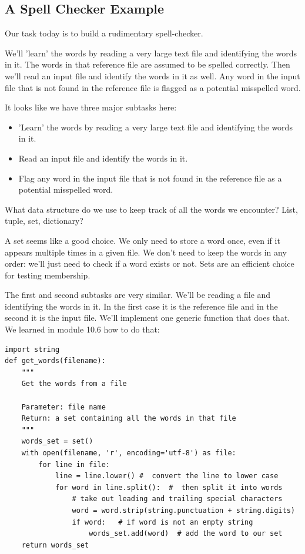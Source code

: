\documentclass{article}
\begin{document}
\subsection{A Spell Checker Example}

Our task today is to build a rudimentary spell-checker.

We’ll 'learn' the words by reading a very large text file and identifying the words in it.  The words in that reference file are assumed to be spelled correctly. Then we'll read an input file and identify the words in it as well.  Any word in the input file that is not found in the reference file is flagged as a potential misspelled word.

It looks like we have three major subtasks here:

\begin{itemize}
\item 'Learn' the words by reading a very large text file and identifying the words in it.  
\item Read an input file and identify the words in it.
\item Flag any word in the input file that is not found in the reference file as a potential misspelled word.
\end{itemize}

What data structure do we use to keep track of all the words we encounter?  List, tuple, set, dictionary?

A set seems like a good choice.  We only need to store a word once, even if it appears multiple times in a given file. We don’t need to keep the words in any order:  we’ll just need to check if a word exists or not.  Sets are an efficient choice for testing membership.

The first and second subtasks are very similar. We'll be reading a file and identifying the words in it.  In the first case it is the reference file and in the second it is the input file.  We'll implement one generic function that does that.  We learned in module 10.6 how to do that:

\begin{lstlisting}
import string
def get_words(filename):
    """
    Get the words from a file

    Parameter: file name
    Return: a set containing all the words in that file
    """
    words_set = set()
    with open(filename, 'r', encoding='utf-8') as file:
        for line in file:
            line = line.lower() #  convert the line to lower case
            for word in line.split():  #  then split it into words
                # take out leading and trailing special characters
                word = word.strip(string.punctuation + string.digits)
                if word:   # if word is not an empty string
                    words_set.add(word)  # add the word to our set
    return words_set
\end{lstlisting}
\end{document}
